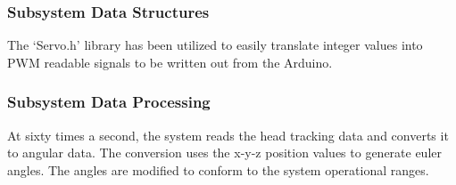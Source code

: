 \subsubsection{Subsystem Data Structures}
The `Servo.h' library has been utilized to easily translate integer values into PWM readable signals to be written out from the Arduino.

\subsubsection{Subsystem Data Processing}
At sixty times a second, the system reads the head tracking data and converts it to angular data. The conversion uses the x-y-z position values to generate euler angles. The angles are modified to conform to the system operational ranges.